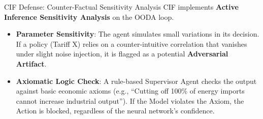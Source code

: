 \documentclass[
  ignorenonframetext,
]{beamer}
\providecommand{\tightlist}{%
  \setlength{\itemsep}{0pt}\setlength{\parskip}{0pt}}
\begin{document}
\begin{frame}{CIF Defense: Counter-Factual Sensitivity Analysis}
\protect{}\label{cif-defense-counter-factual-sensitivity-analysis}
CIF implements \textbf{Active Inference Sensitivity Analysis} on the
OODA loop.

\begin{itemize}
\tightlist
\item
  \textbf{Parameter Sensitivity}: The agent simulates small variations
  in its decision. If a policy (Tariff X) relies on a counter-intuitive
  correlation that vanishes under slight noise injection, it is flagged
  as a potential \textbf{Adversarial Artifact}.
\item
  \textbf{Axiomatic Logic Check}: A rule-based Supervisor Agent checks
  the output against basic economic axioms (e.g., ``Cutting off 100\% of
  energy imports cannot increase industrial output''). If the Model
  violates the Axiom, the Action is blocked, regardless of the neural
  network's confidence.
\end{itemize}
\end{frame}
\end{document}
